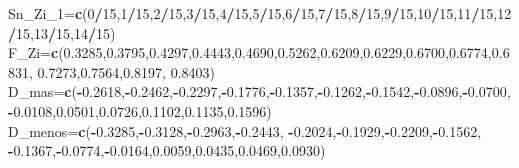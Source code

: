 \documentclass[
  a4paper,
  oneside,
  openany]{book}
\newenvironment{Shaded}{\begin{snugshade}}{\end{snugshade}}
\newcommand{\DecValTok}[1]{\textcolor[rgb]{0.00,0.00,0.81}{#1}}
\newcommand{\FloatTok}[1]{\textcolor[rgb]{0.00,0.00,0.81}{#1}}
\newcommand{\FunctionTok}[1]{\textcolor[rgb]{0.13,0.29,0.53}{\textbf{#1}}}
\newcommand{\NormalTok}[1]{#1}
\newcommand{\OtherTok}[1]{\textcolor[rgb]{0.56,0.35,0.01}{#1}}
\newcommand{\SpecialCharTok}[1]{\textcolor[rgb]{0.81,0.36,0.00}{\textbf{#1}}}
\begin{document}
\begin{Shaded}
\begin{Highlighting}[]
\NormalTok{Sn\_Zi\_1}\OtherTok{=}\FunctionTok{c}\NormalTok{(}\DecValTok{0}\SpecialCharTok{/}\DecValTok{15}\NormalTok{,}\DecValTok{1}\SpecialCharTok{/}\DecValTok{15}\NormalTok{,}\DecValTok{2}\SpecialCharTok{/}\DecValTok{15}\NormalTok{,}\DecValTok{3}\SpecialCharTok{/}\DecValTok{15}\NormalTok{,}\DecValTok{4}\SpecialCharTok{/}\DecValTok{15}\NormalTok{,}\DecValTok{5}\SpecialCharTok{/}\DecValTok{15}\NormalTok{,}\DecValTok{6}\SpecialCharTok{/}\DecValTok{15}\NormalTok{,}\DecValTok{7}\SpecialCharTok{/}\DecValTok{15}\NormalTok{,}\DecValTok{8}\SpecialCharTok{/}\DecValTok{15}\NormalTok{,}\DecValTok{9}\SpecialCharTok{/}\DecValTok{15}\NormalTok{,}\DecValTok{10}\SpecialCharTok{/}\DecValTok{15}\NormalTok{,}\DecValTok{11}\SpecialCharTok{/}\DecValTok{15}\NormalTok{,}\DecValTok{12}\SpecialCharTok{/}\DecValTok{15}\NormalTok{,}\DecValTok{13}\SpecialCharTok{/}\DecValTok{15}\NormalTok{,}\DecValTok{14}\SpecialCharTok{/}\DecValTok{15}\NormalTok{)}
\NormalTok{F\_Zi}\OtherTok{=}\FunctionTok{c}\NormalTok{(}\FloatTok{0.3285}\NormalTok{,}\FloatTok{0.3795}\NormalTok{,}\FloatTok{0.4297}\NormalTok{,}\FloatTok{0.4443}\NormalTok{,}\FloatTok{0.4690}\NormalTok{,}\FloatTok{0.5262}\NormalTok{,}\FloatTok{0.6209}\NormalTok{,}\FloatTok{0.6229}\NormalTok{,}\FloatTok{0.6700}\NormalTok{,}\FloatTok{0.6774}\NormalTok{,}\FloatTok{0.6831}\NormalTok{,}
       \FloatTok{0.7273}\NormalTok{,}\FloatTok{0.7564}\NormalTok{,}\FloatTok{0.8197}\NormalTok{, }\FloatTok{0.8403}\NormalTok{)}
\NormalTok{D\_mas}\OtherTok{=}\FunctionTok{c}\NormalTok{(}\SpecialCharTok{{-}}\FloatTok{0.2618}\NormalTok{,}\SpecialCharTok{{-}}\FloatTok{0.2462}\NormalTok{,}\SpecialCharTok{{-}}\FloatTok{0.2297}\NormalTok{,}\SpecialCharTok{{-}}\FloatTok{0.1776}\NormalTok{,}\SpecialCharTok{{-}}\FloatTok{0.1357}\NormalTok{,}\SpecialCharTok{{-}}\FloatTok{0.1262}\NormalTok{,}\SpecialCharTok{{-}}\FloatTok{0.1542}\NormalTok{,}\SpecialCharTok{{-}}\FloatTok{0.0896}\NormalTok{,}\SpecialCharTok{{-}}\FloatTok{0.0700}\NormalTok{,}
        \SpecialCharTok{{-}}\FloatTok{0.0108}\NormalTok{,}\FloatTok{0.0501}\NormalTok{,}\FloatTok{0.0726}\NormalTok{,}\FloatTok{0.1102}\NormalTok{,}\FloatTok{0.1135}\NormalTok{,}\FloatTok{0.1596}\NormalTok{)}
\NormalTok{D\_menos}\OtherTok{=}\FunctionTok{c}\NormalTok{(}\SpecialCharTok{{-}}\FloatTok{0.3285}\NormalTok{,}\SpecialCharTok{{-}}\FloatTok{0.3128}\NormalTok{,}\SpecialCharTok{{-}}\FloatTok{0.2963}\NormalTok{,}\SpecialCharTok{{-}}\FloatTok{0.2443}\NormalTok{, }\SpecialCharTok{{-}}\FloatTok{0.2024}\NormalTok{,}\SpecialCharTok{{-}}\FloatTok{0.1929}\NormalTok{,}\SpecialCharTok{{-}}\FloatTok{0.2209}\NormalTok{,}\SpecialCharTok{{-}}\FloatTok{0.1562}\NormalTok{,}
           \SpecialCharTok{{-}}\FloatTok{0.1367}\NormalTok{,}\SpecialCharTok{{-}}\FloatTok{0.0774}\NormalTok{,}\SpecialCharTok{{-}}\FloatTok{0.0164}\NormalTok{,}\FloatTok{0.0059}\NormalTok{,}\FloatTok{0.0435}\NormalTok{,}\FloatTok{0.0469}\NormalTok{,}\FloatTok{0.0930}\NormalTok{)  }


\end{Highlighting}
\end{Shaded}
\end{document}
